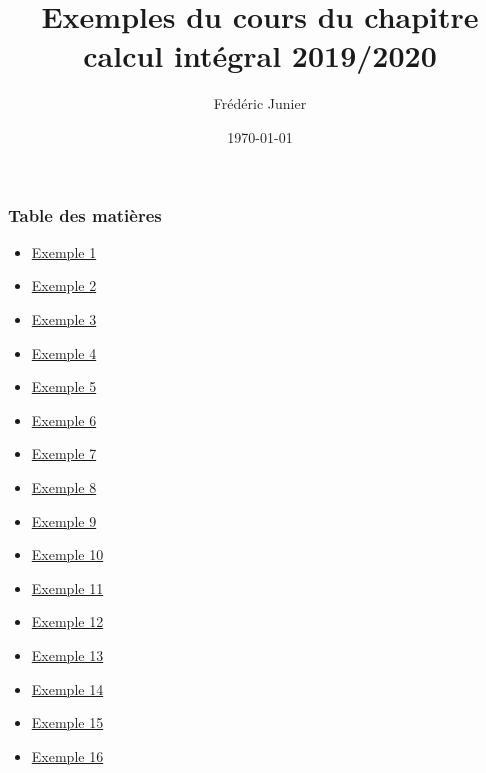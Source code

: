 \documentclass[11pt, hyperref={urlcolor=red,%
            linkcolor=blue, %
            colorlinks=true}]{beamer}
\title[int\'egration]{Exemples du cours du chapitre calcul int\'egral 2019/2020}
\author[F.Junier]{Fr\'ed\'eric Junier}
\institute[Le Parc]{{\centering Lyc\'ee du Parc \\
1 Boulevard Anatole France \\ 69006 Lyon }}
\date[\today]{\today}
\begin{document}
\frame{\titlepage}




\begin{frame}
\frametitle{Table des matières}
\begin{itemize}
	\item \hyperlink{exemple1}{Exemple 1}
	\item \hyperlink{exemple2}{Exemple 2}
	\item \hyperlink{exemple3}{Exemple 3}
	\item \hyperlink{exemple4}{Exemple 4}
	\item \hyperlink{exemple5}{Exemple 5}
	\item \hyperlink{exemple6}{Exemple 6}
		\item \hyperlink{exemple7}{Exemple 7}
			\item \hyperlink{exemple8}{Exemple 8}
			\item \hyperlink{exemple9}{Exemple 9}
				\item \hyperlink{exemple10}{Exemple 10}
						\item \hyperlink{exemple11}{Exemple 11}
						\item \hyperlink{exemple12}{Exemple 12}
						\item \hyperlink{exemple13}{Exemple 13}
						\item \hyperlink{exemple14}{Exemple 14}
						\item \hyperlink{exemple15}{Exemple 15}
						\item \hyperlink{exemple16}{Exemple 16}
\end{itemize}

\end{frame}
\end{document}
